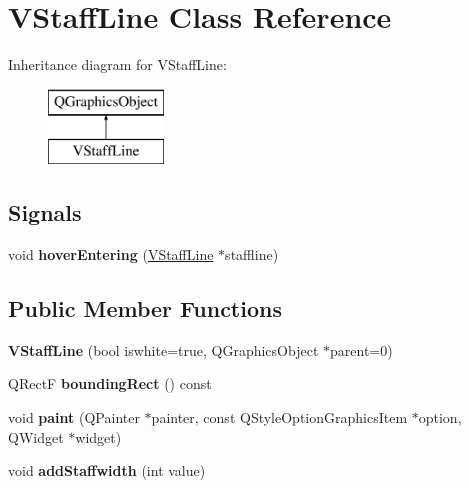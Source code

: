 \hypertarget{class_v_staff_line}{}\section{V\+Staff\+Line Class Reference}
\label{class_v_staff_line}
Inheritance diagram for V\+Staff\+Line\+:\begin{figure}[H]
\begin{center}
\leavevmode
\includegraphics[height=2.000000cm]{class_v_staff_line}
\end{center}
\end{figure}
\subsection*{Signals}
\begin{DoxyCompactItemize}
\item 
\hypertarget{class_v_staff_line_ab68a189c08552b4c039f904ecd339e71}{}void {\bfseries hover\+Entering} (\hyperlink{class_v_staff_line}{V\+Staff\+Line} $\ast$staffline)\label{class_v_staff_line_ab68a189c08552b4c039f904ecd339e71}

\end{DoxyCompactItemize}
\subsection*{Public Member Functions}
\begin{DoxyCompactItemize}
\item 
\hypertarget{class_v_staff_line_ac7c68bb0fb73b6f6818ab9d51192fb60}{}{\bfseries V\+Staff\+Line} (bool iswhite=true, Q\+Graphics\+Object $\ast$parent=0)\label{class_v_staff_line_ac7c68bb0fb73b6f6818ab9d51192fb60}

\item 
\hypertarget{class_v_staff_line_ae2e42820d76de2c34f1f546fd1dde643}{}Q\+Rect\+F {\bfseries bounding\+Rect} () const \label{class_v_staff_line_ae2e42820d76de2c34f1f546fd1dde643}

\item 
\hypertarget{class_v_staff_line_a9bf019b9c17fc3d64634127eed4682c8}{}void {\bfseries paint} (Q\+Painter $\ast$painter, const Q\+Style\+Option\+Graphics\+Item $\ast$option, Q\+Widget $\ast$widget)\label{class_v_staff_line_a9bf019b9c17fc3d64634127eed4682c8}

\item 
\hypertarget{class_v_staff_line_ae64934fb567dedfef9cd9acdc8bce4b0}{}void {\bfseries add\+Staffwidth} (int value)\label{class_v_staff_line_ae64934fb567dedfef9cd9acdc8bce4b0}

\end{DoxyCompactItemize}
